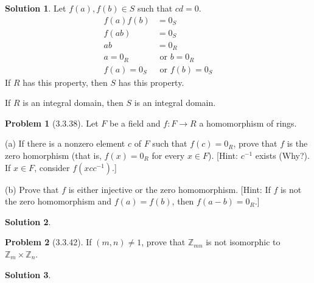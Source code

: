 \documentclass[12pt]{article}
\theoremstyle{definition}
\newtheorem*{prob}{Problem}
\newtheorem*{soln}{Solution}
\newcommand{\ZZ}{{\mathbb{Z}}}
\begin{document}
\begin{soln}
Let $f(a),f(b)\in S$ such that $cd=0$.
\begin{align*}
f(a)f(b)&=0_S\\
f(ab)&=0_S\\
ab&=0_R\\
a=0_R&\text{ or }b=0_R\\
f(a)=0_S&\text{ or }f(b)=0_S
\end{align*}
If $R$ has this property, then $S$ has this property.

If $R$ is an integral domain, then $S$ is an integral domain.

\end{soln}

\begin{prob}[3.3.38]
Let $F$ be a field and $f:F \to R$ a homomorphism of  rings.     

(a)   If there is a nonzero element $c$ of  $F$ such that $f(c) = 0_R$, 
prove that $f$ is the zero homorphism (that is, $f(x) = 0_R$ for every $x\in F$). 
[Hint: $c^{-1}$ exists (Why?). If  $x\in F$, consider $f(xcc^{-1})$.]     

(b)   Prove that $f$ is either injective or the zero homomorphism. 
[Hint: If  $f$ is not the zero homomorphism and $f(a) = f(b)$, then $f(a - b) = 0_R$.]
\end{prob}

\begin{soln}

\end{soln}


\begin{prob}[3.3.42]
If  $(m, n) \neq 1$, prove that $\ZZ_{mn}$ is not isomorphic to $\ZZ_m \times \ZZ_n$.
\end{prob}

\begin{soln}

\end{soln}
\end{document}
